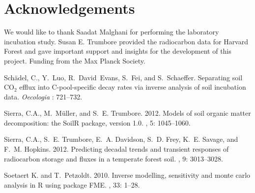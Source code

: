 \documentclass[a4paper]{article}\usepackage[]{graphicx}\usepackage[]{color}
\begin{document}
\clearpage
\section*{Acknowledgements}
We would like to thank Saadat Malghani for performing the laboratory incubation study. Susan E. Trumbore provided the radiocarbon data for Harvard Forest and gave important support and insights for the development of this project. Funding from the Max Planck Society. 

\begin{thebibliography}{9}
 Sch{\"a}del, C., Y.~Luo, R.~David~Evans, S.~Fei, and S.~Schaeffer.
\newblock Separating soil {CO$_2$} efflux into {C}-pool-specific decay rates
  via inverse analysis of soil incubation data. {\it Oecologia} : 721--732.

 Sierra, C.A., M.~M\"uller, and S.~E. Trumbore. 2012. \newblock Models of soil organic matter decomposition: the {SoilR} package, version 1.0. , 5: 1045--1060.

 Sierra, C.A., S.~E. Trumbore, E.~A. Davidson, S.~D. Frey, K.~E. Savage, and  F.~M. Hopkins. 2012.
\newblock Predicting decadal trends and transient responses of radiocarbon storage and fluxes in a temperate forest soil.
, 9: 3013--3028.

 Soetaert K. and T.~Petzoldt. 2010. \newblock Inverse modelling, sensitivity and monte carlo analysis in R using   package FME. , 33: 1--28.

\end{thebibliography}
\end{document}
